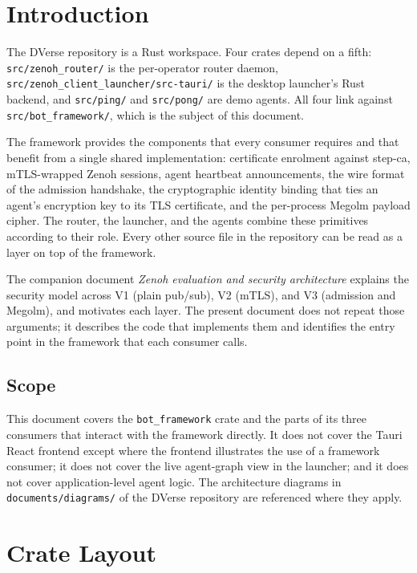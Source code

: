 \documentclass[11pt,a4paper]{article}
\begin{document}
\section{Introduction}

The DVerse repository is a Rust workspace. Four crates depend on a
fifth: \texttt{src/zenoh\_router/} is the per-operator router daemon,
\texttt{src/zenoh\_client\_launcher/src-tauri/} is the desktop
launcher's Rust backend, and \texttt{src/ping/} and \texttt{src/pong/}
are demo agents. All four link against \texttt{src/bot\_framework/},
which is the subject of this document.

The framework provides the components that every consumer
requires and that benefit from a single shared implementation:
certificate enrolment against step-ca, mTLS-wrapped Zenoh
sessions, agent heartbeat announcements, the wire format of the
admission handshake, the cryptographic identity binding that ties
an agent's encryption key to its TLS certificate, and the
per-process Megolm payload cipher. The router, the launcher, and
the agents combine these primitives according to their role.
Every other source file in the repository can be read as a layer
on top of the framework.

The companion document \emph{Zenoh evaluation and security
architecture} explains the security model across V1 (plain
pub/sub), V2 (mTLS), and V3 (admission and Megolm), and motivates
each layer. The present document does not repeat those arguments;
it describes the code that implements them and identifies the
entry point in the framework that each consumer calls.

\subsection{Scope}

This document covers the \texttt{bot\_framework} crate and the
parts of its three consumers that interact with the framework
directly. It does not cover the Tauri React frontend except where
the frontend illustrates the use of a framework consumer; it does
not cover the live agent-graph view in the launcher; and it does
not cover application-level agent logic. The architecture
diagrams in \texttt{documents/diagrams/} of the DVerse repository
are referenced where they apply.

\section{Crate Layout}
\end{document}
